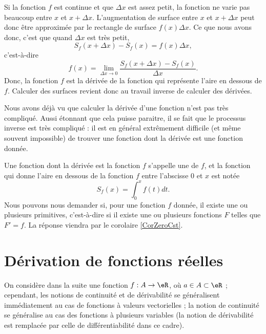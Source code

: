 Si la fonction \( f\) est continue et que \( \Delta x\) est assez petit, la fonction ne varie pas beaucoup entre \( x\) et \( x+\Delta x\). L'augmentation de surface entre \( x\) et \( x+\Delta x\) peut donc être approximée par le rectangle de surface \( f(x)\Delta x\). Ce que nous avons donc, c'est que quand \( \Delta x\) est très petit,
\begin{equation}
	S_f(x+\Delta x)-S_f(x)=f(x)\Delta x,
\end{equation}
c'est-à-dire
\begin{equation}
	f(x)=\lim_{\Delta x\to 0}\frac{  S_f(x+\Delta x)-S_f(x)}{ \Delta x }.
\end{equation}
Donc, la fonction \( f\) est la dérivée de la fonction qui représente l'aire en dessous de \( f\). Calculer des surfaces revient donc au travail inverse de calculer des dérivées.

Nous avons déjà vu que calculer la dérivée d'une fonction n'est pas très compliqué. Aussi étonnant que cela puisse paraitre, il se fait que le processus inverse est très compliqué : il est en général extrêmement difficile (et même souvent impossible) de trouver une fonction dont la dérivée est une fonction donnée.

Une fonction dont la dérivée est la fonction \( f\) s'appelle une  de \( f\), et la fonction qui donne l'aire en dessous de la fonction \( f\) entre l'abscisse \( 0\) et \( x\) est notée
\begin{equation}
	S_f(x)=\int_0^xf(t)dt.
\end{equation}
Nous pouvons nous demander si, pour une fonction \( f\) donnée, il existe une ou plusieurs primitives, c'est-à-dire si il existe une ou plusieurs fonctions \( F\) telles que \( F'=f\). La réponse viendra par le corolaire \ref{CorZeroCst}.

\section{Dérivation de fonctions réelles}
\label{seccontetderiv}

On considère dans la suite une fonction \( f : A \to \eR\), où \( a \in A \subset \eR\) ; cependant, les notions de continuité et de dérivabilité se généralisent immédiatement au cas de fonctions à valeurs vectorielles ; la notion de continuité se généralise au cas des fonctions à plusieurs variables (la notion de dérivabilité est remplacée par celle de différentiabilité dans ce cadre).

